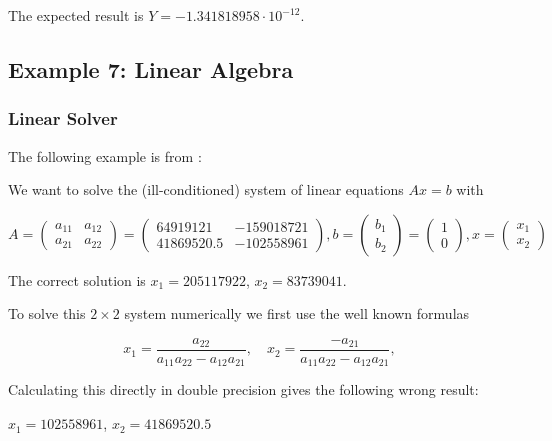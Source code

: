 The expected result is $Y = -1.341818958 \cdot 10^{-12}$.





\subsection{Example 7: Linear Algebra}


\subsubsection{Linear Solver}
The following example is from \cite{Hofschuster2004}:

We want to solve the (ill-conditioned) system of linear equations $Ax = b$ with

\begin{equation}
A = \begin{pmatrix}
a_{11} & a_{12} \\
a_{21} & a_{22} 
\end{pmatrix}  = \begin{pmatrix}
64919121 & -159018721 \\
41869520.5 & -102558961 
\end{pmatrix}, b = \begin{pmatrix}
b_{1} \\
b_{2} 
\end{pmatrix}
= \begin{pmatrix}
1 \\
0
\end{pmatrix} , x = \begin{pmatrix}
x_{1} \\
x_{2} 
\end{pmatrix}
\end{equation}

The correct solution is $x_1 = 205117922$, $x_2 = 83739041$.

To solve this $2 \times 2$ system numerically we first use the well known formulas

\begin{equation}
x_1 = \frac{a_{22}}{a_{11}a_{22} - a_{12}a_{21}}, \quad x_2 = \frac{-a_{21}}{a_{11}a_{22} - a_{12}a_{21}},
\end{equation}

Calculating this directly in double precision gives the following wrong result:  

$x_1 = 102558961$, $x_2 = 41869520.5$

%







